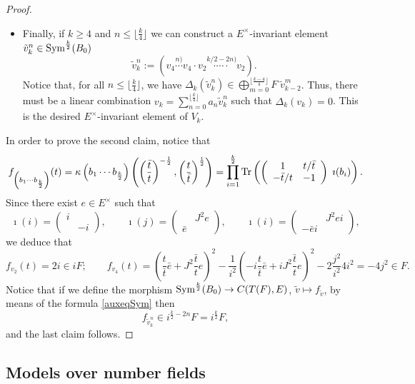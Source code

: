 \documentclass{amsart}
\theoremstyle{definition}
\theoremstyle{remark}
\numberwithin{equation}{section}
\newcommand{\ipa}[1]{\left(#1\right)}
\begin{document}
\begin{proof}
\begin{itemize}
\item Finally, if $k\geq 4$ and $n\leq \lfloor\frac{k}{4}\rfloor$ we can construct a $E^\times$-invariant element $\tilde v_k^n\in {\rm Sym}^{\frac{k}{2}}(B_0)$
\[
\tilde v_k^n:=
    \left(v_4\stackrel{n)}{\cdots}v_4\cdot v_2\stackrel{k/2-2n)}{\cdot\cdots\cdot}v_2\right).
\]
Notice that, for all $n\leq \lfloor\frac{k}{4}\rfloor$, we have
$\Delta_k(\tilde v_k^n)\in \bigoplus_{m=0}^{\lfloor\frac{k-4}{4}\rfloor}F\; \tilde v_{k-2}^m$.
Thus, there must be a linear combination $v_k=\sum_{n=0}^{\lfloor\frac{k}{4}\rfloor}a_n\tilde v_k^n$ such that $\Delta_k(v_k)=0$. This is the desired $E^\times$-invariant element of $V_k$.
\end{itemize}
In order to prove the second claim, notice that
\begin{equation}\label{auxeqSym}
    f_{\left(b_1\cdots b_{\frac{k}{2}}\right)}(t)=\kappa\left(b_1\cdots b_{\frac{k}{2}}\right)\ipa{\ipa{\frac{\bar t}{t}}^{-\frac{1}{2}},\ipa{\frac{t}{\bar t}}^{\frac{1}{2}}}=\prod_{i=1}^{\frac{k}{2}}{\rm Tr}\left(\left(\begin{array}{cc}  1&t/\bar t\\-\bar t/t&-1\end{array}\right)\;\imath(b_i)\right).
\end{equation}
Since there exist $e\in E^\times$ such that
\[
\imath(i)=\left(\begin{array}{cc}  i&\\&-i\end{array}\right),\qquad \imath(j)=\left(\begin{array}{cc}  &J^2e\\\bar e&\end{array}\right),\qquad \imath(i)=\left(\begin{array}{cc}  &J^2ei\\-\bar ei&\end{array}\right),
\]
we deduce that
\[
f_{v_2}(t)=2i\in i F;\qquad f_{v_4}(t)=\ipa{\frac{t}{\bar t}\bar e+J^2\frac{\bar t}{t}e}^2-\frac{1}{i^2}\ipa{-i\frac{t}{\bar t}\bar e+iJ^2\frac{\bar t}{t}e}^2-2\frac{j^2}{i^2}4i^2=-4j^2\in F.
\]
Notice that if we define the morphism ${\rm Sym}^{\frac{k}{2}}(B_0)\rightarrow C(T(F),E)$, $\tilde v\mapsto f_{\tilde v}$, by means of the formula \eqref{auxeqSym} then 
\[
f_{\tilde v_k^n}\in  i^{\frac{k}{2}-2n}F=i^{\frac{k}{2}}F, 
\]
and the last claim follows.
\end{proof}

\subsection{Models over number fields}\label{remdefmodVk}
\end{document}
